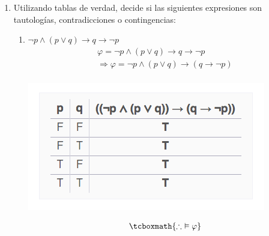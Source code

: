 \documentclass[10pt,letterpaper]{article}
\begin{document}
\begin{enumerate}
    \clearpage
    \item Utilizando tablas de verdad, decide si las siguientes expresiones son
        tautologías, contradicciones o contingencias:
        \begin{enumerate}
            \item $\neg p \land (p \lor q) \rightarrow q \rightarrow \neg p$
                \begin{equation*} \begin{split}
                    \varphi = \neg p \land (p \lor q) \rightarrow q \rightarrow \neg p \\
                    \Rightarrow \varphi = \neg p \land (p \lor q) \rightarrow (q \rightarrow \neg p) \\
                \end{split} \end{equation*}
                \begin{center}
                    \includegraphics[scale=.5]{../assets/img/3-a.png}
                \end{center}
                \begin{equation*} \begin{split}
                    \tcboxmath{\therefore \, \,  \vDash \varphi}
                \end{split} \end{equation*}


\end{enumerate}
\end{enumerate}
\end{document}
